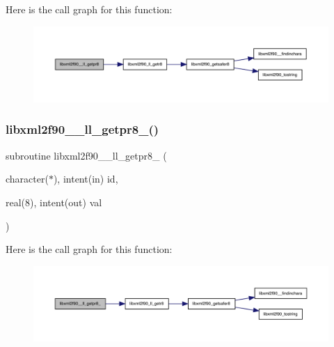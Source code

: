 Here is the call graph for this function\+:
\nopagebreak
\begin{figure}[H]
\begin{center}
\leavevmode
\includegraphics[width=350pt]{libxml2f90_8f90__pp_8f90_a5ffa8a56b1901a92be64556fe9f30e07_cgraph}
\end{center}
\end{figure}
\mbox{\label{libxml2f90_8f90__pp_8f90_a2a94c2cace24434f63c63fb2b59ed196}} 
\subsubsection{\texorpdfstring{libxml2f90\+\_\+\+\_\+ll\+\_\+getpr8\+\_\+()}{libxml2f90\_\_ll\_getpr8\_()}}
{\footnotesize\ttfamily subroutine libxml2f90\+\_\+\+\_\+ll\+\_\+getpr8\+\_\+ (\begin{DoxyParamCaption}\item[{character($\ast$), intent(in)}]{id,  }\item[{real(8), intent(out)}]{val }\end{DoxyParamCaption})}

Here is the call graph for this function\+:
\nopagebreak
\begin{figure}[H]
\begin{center}
\leavevmode
\includegraphics[width=350pt]{libxml2f90_8f90__pp_8f90_a2a94c2cace24434f63c63fb2b59ed196_cgraph}
\end{center}
\end{figure}
\mbox{\label{libxml2f90_8f90__pp_8f90_ab594e6f189158ab0e2fc4db0d03392ad}} 
